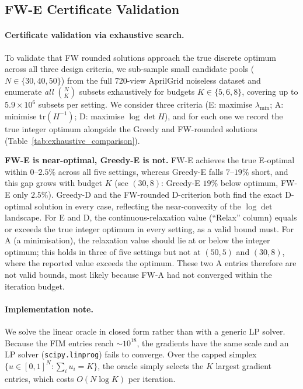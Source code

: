 \documentclass[letterpaper, 9
 pt, conference]{ieeeconf}
\begin{document}
\FloatBarrier

\subsection{FW-E Certificate Validation}
\label{subsec:fw_certificate}

\paragraph{Certificate validation via exhaustive search.}
To validate that FW rounded solutions approach the true discrete optimum across
all three design criteria, we sub-sample small candidate pools
($N\in\{30,40,50\}$) from the full 720-view AprilGrid noiseless dataset and
enumerate \emph{all} $\binom{N}{K}$ subsets exhaustively for budgets
$K\in\{5,6,8\}$, covering up to $5.9{\times}10^6$ subsets per setting.
We consider three criteria (E: maximise $\lambda_{\min}$; A: minimise
$\mathrm{tr}(H^{-1})$; D: maximise $\log\det H$), and for each one we record the true integer
optimum alongside the Greedy and FW-rounded solutions
(Table~\ref{tab:exhaustive_comparison}).

\textbf{FW-E is near-optimal, Greedy-E is not.}
FW-E achieves the true E-optimal within $0$--$2.5\%$ across all five settings,
whereas Greedy-E falls $7$--$19\%$ short, and this gap grows with
budget $K$ (see $(30,8)$: Greedy-E $19\%$ below optimum, FW-E only $2.5\%$).
Greedy-D and the FW-rounded D-criterion both find the exact D-optimal solution
in every case, reflecting the near-convexity of the $\log\det$ landscape.
For E and D, the continuous-relaxation value (``Relax'' column) equals or
exceeds the true integer optimum in every setting, as a valid bound must.
For A (a minimisation), the relaxation value should lie at or below the
integer optimum; this holds in three of five settings but not at $(50,5)$
and $(30,8)$, where the reported value exceeds the optimum. These two A
entries therefore are not valid bounds, most likely because FW-A had not
converged within the iteration budget.

\paragraph{Implementation note.}
We solve the linear oracle in closed form rather than with a generic LP solver.
Because the FIM entries reach ${\sim}10^{18}$, the gradients have the same
scale and an LP solver (\texttt{scipy.linprog}) fails to converge.
Over the capped simplex $\{u\in[0,1]^N : \sum_i u_i = K\}$, the oracle simply
selects the $K$ largest gradient entries, which costs $O(N\log K)$ per iteration.
\end{document}
